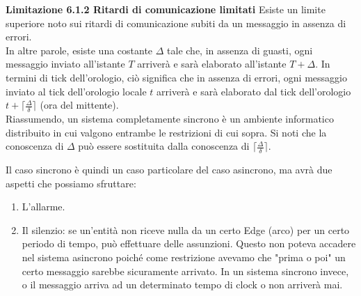 \textbf{Limitazione 6.1.2 Ritardi di comunicazione limitati} Esiste un limite
superiore noto sui ritardi di comunicazione subiti da un messaggio in assenza di
errori.\\
In altre parole, esiste una costante $\Delta$ tale che, in assenza di guasti,
ogni messaggio inviato all'istante $T$ arriverà e sarà elaborato all'istante $T
    + \Delta$. In termini di tick dell'orologio, ciò significa che in assenza di
errori, ogni messaggio inviato al tick dell'orologio locale $t$ arriverà e sarà
elaborato dal tick dell'orologio $t + \lceil \frac{\Delta}{\delta} \rceil$ (ora
del mittente).\\

Riassumendo, un sistema completamente sincrono è un ambiente informatico
distribuito in cui valgono entrambe le restrizioni di cui sopra. Si noti che la
conoscenza di $\Delta$ può essere sostituita dalla conoscenza di $\lceil
    \frac{\Delta}{\delta} \rceil$.

Il caso sincrono è quindi un caso particolare del caso asincrono, ma avrà due
aspetti che possiamo sfruttare:
\begin{enumerate}
    \item L'allarme.
    \item Il silenzio: se un'entità non riceve nulla da un certo Edge (arco) per
          un certo periodo di tempo, può effettuare delle assunzioni. Questo non poteva
          accadere nel sistema asincrono poiché come restrizione avevamo che "prima o
          poi" un certo messaggio sarebbe sicuramente arrivato.  In un sistema sincrono
          invece, o il messaggio arriva ad un determinato tempo di clock o non arriverà
          mai.
\end{enumerate}


